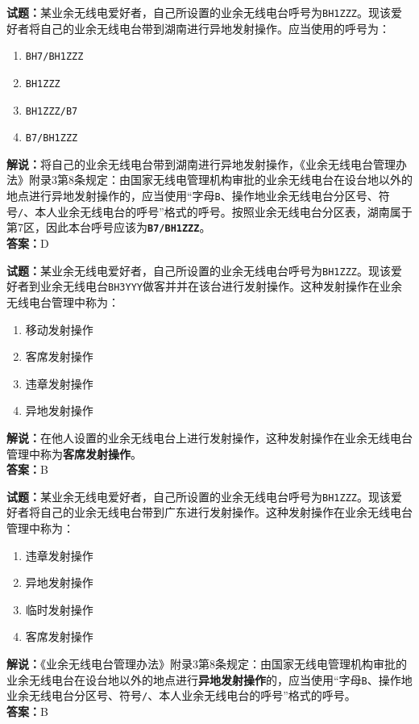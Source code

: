 \documentclass{ctexbook}
\begin{document}
\noindent\textbf{试题：}某业余无线电爱好者，自己所设置的业余无线电台呼号为\texttt{BH1ZZZ}。现该爱好者将自己的业余无线电台带到湖南进行异地发射操作。应当使用的呼号为：
\begin{enumerate}[leftmargin=3em]
  \item \texttt{BH7/BH1ZZZ}
  \item \texttt{BH1ZZZ}
  \item \texttt{BH1ZZZ/B7}
  \item \texttt{B7/BH1ZZZ}
\end{enumerate}
\noindent\textbf{解说：}将自己的业余无线电台带到湖南进行异地发射操作，《业余无线电台管理办法》附录3第8条规定：由国家无线电管理机构审批的业余无线电台在设台地以外的地点进行异地发射操作的，应当使用“字母\texttt{B}、操作地业余无线电台分区号、符号\texttt{/}、本人业余无线电台的呼号”格式的呼号。按照业余无线电台分区表，湖南属于第7区，因此本台呼号应该为\texttt{\textbf{B7/BH1ZZZ}}。\\\noindent\textbf{答案：}D

\vspace{\baselineskip}

\noindent\textbf{试题：}某业余无线电爱好者，自己所设置的业余无线电台呼号为\texttt{BH1ZZZ}。现该爱好者到业余无线电台\texttt{BH3YYY}做客并并在该台进行发射操作。这种发射操作在业余无线电台管理中称为：
\begin{enumerate}[leftmargin=3em]
  \item 移动发射操作
  \item 客席发射操作
  \item 违章发射操作
  \item 异地发射操作
\end{enumerate}
\noindent\textbf{解说：}在他人设置的业余无线电台上进行发射操作，这种发射操作在业余无线电台管理中称为\textbf{客席发射操作}。\\
\noindent\textbf{答案：}B

\vspace{\baselineskip}

\noindent\textbf{试题：}某业余无线电爱好者，自己所设置的业余无线电台呼号为\texttt{BH1ZZZ}。现该爱好者将自己的业余无线电台带到广东进行发射操作。这种发射操作在业余无线电台管理中称为：
\begin{enumerate}[leftmargin=3em]
  \item 违章发射操作
  \item 异地发射操作
  \item 临时发射操作
  \item 客席发射操作
\end{enumerate}
\noindent\textbf{解说：}《业余无线电台管理办法》附录3第8条规定：由国家无线电管理机构审批的业余无线电台在设台地以外的地点进行\textbf{异地发射操作}的，应当使用“字母\texttt{B}、操作地业余无线电台分区号、符号\texttt{/}、本人业余无线电台的呼号”格式的呼号。\\\noindent\textbf{答案：}B
\end{document}
